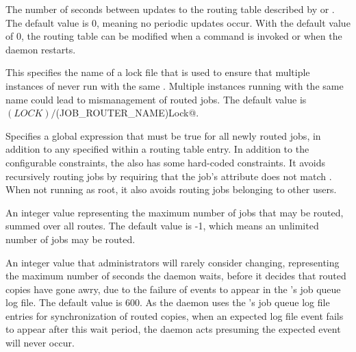 \begin{description}
\label{param:JobRouterEntriesRefresh}
\item[\Macro{JOB\_ROUTER\_ENTRIES\_REFRESH}]
  The number of seconds between updates to the routing table described by
   or
  .
  The default value is 0, meaning no periodic updates occur.
  With the default value of 0, the routing table can be modified
  when a  command is invoked 
  or when the  daemon restarts.

\label{JobRouterLock}
\item[\Macro{JOB\_ROUTER\_LOCK}] This specifies the name of a lock
 file that is used to ensure that multiple instances of
  never run with the same
 .  Multiple instances running with the
 same name could lead to mismanagement of routed jobs.  The default
 value is \verb@$(LOCK)/$(JOB_ROUTER_NAME)Lock@.

\label{JobRouterSourceJobConstraint}
\item[\Macro{JOB\_ROUTER\_SOURCE\_JOB\_CONSTRAINT}]
  Specifies a global  expression that must be true
  for all newly routed jobs,
  in addition to any  specified within a routing table entry.
  In addition to the configurable constraints, the
  also has some hard-coded constraints.  It avoids
 recursively routing jobs by requiring that the job's attribute 
 does not match .  When not running as root,
 it also avoids routing jobs belonging to other users.

\label{JobRouterMaxJobs}
\item[\Macro{JOB\_ROUTER\_MAX\_JOBS}]
  An integer value representing the maximum number of jobs that may be routed,
  summed over all routes.
  The default value is -1, which means an unlimited number of jobs
  may be routed.

\label{MaxJobMirrorUpdateLag}
\item[\Macro{MAX\_JOB\_MIRROR\_UPDATE\_LAG}]
  An integer value that administrators will rarely consider changing,
  representing the maximum number of
  seconds the  daemon waits,
  before it decides that routed copies have gone awry,
  due to the failure of events to appear
  in the 's job queue log file.
  The default value is 600.
  As the  daemon uses the 's
  job queue log file entries for synchronization of routed copies,
  when an expected log file event fails to appear after this wait period,
  the  daemon acts presuming the expected event
  will never occur.


\end{description}
